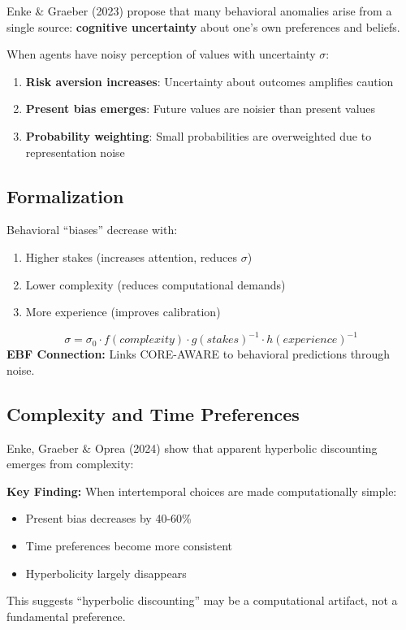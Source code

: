 Enke \& Graeber (2023) propose that many behavioral anomalies arise from a single source: \textbf{cognitive uncertainty} about one's own preferences and beliefs.

\begin{theorem}
When agents have noisy perception of values with uncertainty $\sigma$:
\begin{enumerate}
    \item \textbf{Risk aversion increases}: Uncertainty about outcomes amplifies caution
    \item \textbf{Present bias emerges}: Future values are noisier than present values
    \item \textbf{Probability weighting}: Small probabilities are overweighted due to representation noise
\end{enumerate}
\end{theorem}

\subsection{Formalization}

\begin{axiom}
\label{ax:be4}
Behavioral ``biases'' decrease with:
\begin{enumerate}
    \item Higher stakes (increases attention, reduces $\sigma$)
    \item Lower complexity (reduces computational demands)
    \item More experience (improves calibration)
\end{enumerate}
\begin{equation}
\sigma = \sigma_0 \cdot f(complexity) \cdot g(stakes)^{-1} \cdot h(experience)^{-1}
\end{equation}
\textbf{EBF Connection:} Links CORE-AWARE to behavioral predictions through noise.
\end{axiom}

\subsection{Complexity and Time Preferences}

Enke, Graeber \& Oprea (2024) show that apparent hyperbolic discounting emerges from complexity:

\begin{tcolorbox}[colback=blue!5!white, colframe=blue!75!black]
\textbf{Key Finding:} When intertemporal choices are made computationally simple:
\begin{itemize}
    \item Present bias decreases by 40-60\%
    \item Time preferences become more consistent
    \item Hyperbolicity largely disappears
\end{itemize}
This suggests ``hyperbolic discounting'' may be a computational artifact, not a fundamental preference.
\end{tcolorbox}

